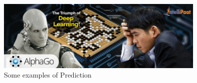 \begin{itemize}
          \vspace{5mm}

          \begin{figure}[h]
              \centering
              \includegraphics[width=0.9\textwidth]{../img/AlphaGo}
              \caption{Some examples of Prediction}
          \end{figure}

          \vspace{5mm}
\end{itemize}
